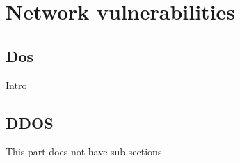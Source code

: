 \chapter{Network vulnerabilities}

\section{Dos}

Intro


\section{DDOS}

This part does not have sub-sections

